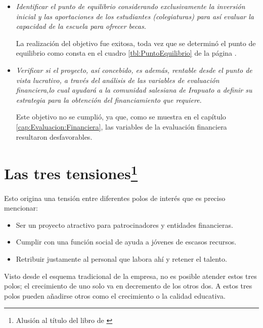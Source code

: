 \begin{itemize}
	\item \emph{Identificar el punto de equilibrio considerando exclusivamente la inversión inicial y las aportaciones de los estudiantes (colegiaturas) para así evaluar la capacidad de la escuela para ofrecer becas.}

		La realización del objetivo fue exitosa, toda vez que se determinó el punto de equilibrio como consta en el cuadro \ref{tbl:PuntoEquilibrio} de la página \pageref{tbl:PuntoEquilibrio}.

	\item \emph{Verificar si el proyecto, así concebido, es además, rentable desde el punto de vista lucrativo, a través del análisis de las variables de evaluación financiera,lo cual ayudará a la comunidad salesiana de Irapuato a definir su estrategia para la obtención del financiamiento que requiere}.

	Este objetivo no se cumplió, ya que, como se muestra en el capítulo \ref{cap:Evaluacion:Financiera}, las variables de la evaluación financiera resultaron desfavorables.

\end{itemize}

\section*{Las tres tensiones\footnote{Alusión al título del libro de \citep{FABARO2008}}}

Esto origina una tensión entre diferentes polos de interés que es preciso mencionar:

\begin{itemize}
	\item Ser un proyecto atractivo para patrocinadores y entidades financieras.
	\item Cumplir con una función social de ayuda a jóvenes de escasos recursos.
	\item Retribuir justamente al personal que labora ahí y retener el talento.
\end{itemize}

Visto desde el esquema tradicional de la empresa, no es posible atender estos tres polos; el crecimiento de uno solo va en decremento de los otros dos. A estos tres polos pueden añadirse otros como el crecimiento o la calidad educativa.

